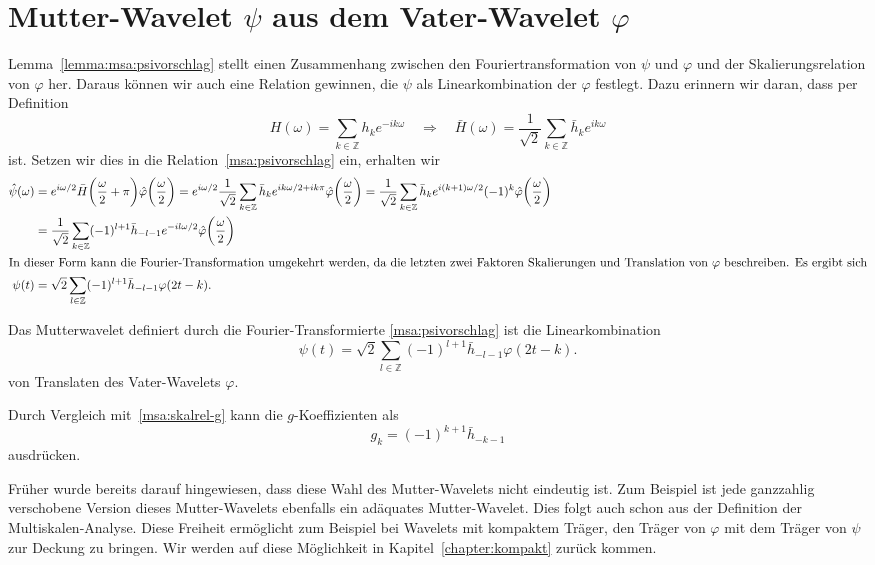 \section{Mutter-Wavelet $\psi$ aus dem Vater-Wavelet $\varphi$}
Lemma~\ref{lemma:msa:psivorschlag} stellt einen Zusammenhang zwischen
den Fouriertransformation von $\psi$ und $\varphi$ und der Skalierungsrelation
von $\varphi$ her.
Daraus können wir auch eine Relation gewinnen, die $\psi$ als
Linearkombination der $\varphi$ festlegt.
Dazu erinnern wir daran, dass per Definition
\[
H(\omega) = \sum_{k\in\mathbb Z} h_k e^{-ik\omega} 
\quad\Rightarrow\quad
\bar{H}(\omega)
=
\frac{1}{\sqrt{2}}
\sum_{k\in\mathbb Z} \bar{h}_k e^{ik\omega} 
\]
ist.
Setzen wir dies in die Relation~\eqref{msa:psivorschlag} ein, erhalten wir
\begin{align*}
\hat{\psi}(\omega)
&=
e^{i\omega/2}
\bar{H}\biggl(\frac{\omega}2+\pi\biggr)
\hat{\varphi}\biggl(\frac{\omega}2\biggr)
=
e^{i\omega/2}
\frac{1}{\sqrt{2}}
\sum_{k\in\mathbb Z} \bar{h}_k e^{ik\omega/2 + ik\pi} 
\hat{\varphi}\biggl(\frac{\omega}2\biggr)
=
\frac{1}{\sqrt{2}}
\sum_{k\in\mathbb Z} \bar{h}_k e^{i(k+1)\omega/2} (-1)^k
\hat{\varphi}\biggl(\frac{\omega}2\biggr)
\\
&=
\frac{1}{\sqrt{2}}
\sum_{k\in\mathbb Z}
(-1)^{l+1}
\bar{h}_{-l-1} e^{-il\omega/2}
\hat{\varphi}\biggl(\frac{\omega}2\biggr)
\\
\intertext{In dieser Form kann die Fourier-Transformation umgekehrt werden,
da die letzten zwei Faktoren Skalierungen und Translation von $\varphi$
beschreiben.
Es ergibt sich}
\psi(t)
&=
\sqrt{2}\sum_{l\in\mathbb Z} (-1)^{l+1}\bar{h}_{-l-1} \varphi(2t-k).
\end{align*}

\begin{lemma}
\label{lemma:msa:psirelation}
Das Mutterwavelet definiert durch die Fourier-Transformierte
\eqref{msa:psivorschlag}
ist die Linearkombination
\begin{equation}
\psi(t)
=
\sqrt{2}\sum_{l\in\mathbb Z} (-1)^{l+1}\bar{h}_{-l-1} \varphi(2t-k).
\end{equation}
von Translaten des Vater-Wavelets $\varphi$.
\end{lemma}

Durch Vergleich mit~\eqref{msa:skalrel-g} kann die $g$-Koeffizienten als
\[
g_k = (-1)^{k+1} \bar{h}_{-k-1}
\]
ausdrücken.

Früher wurde bereits darauf hingewiesen, dass diese Wahl des Mutter-Wavelets
nicht eindeutig ist.
Zum Beispiel ist jede ganzzahlig verschobene Version dieses Mutter-Wavelets
ebenfalls ein adäquates Mutter-Wavelet.
Dies folgt auch schon aus der Definition der Multiskalen-Analyse.
Diese Freiheit ermöglicht zum Beispiel bei Wavelets mit kompaktem Träger,
den Träger von $\varphi$ mit dem Träger von $\psi$ zur Deckung zu
bringen.
Wir werden auf diese Möglichkeit in Kapitel~\ref{chapter:kompakt}
zurück kommen.


